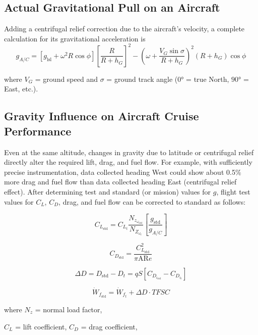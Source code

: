 \documentclass[
]{book}
\begin{document}
\hypertarget{actual-gravitational-pull-on-an-aircraft}{%
\subsection*{Actual Gravitational Pull on an Aircraft}\label{actual-gravitational-pull-on-an-aircraft}}

Adding a centrifugal relief correction due to the aircraft's velocity, a complete calculation for its gravitational acceleration is
\[
g_{A/C} = \left[ g_{\mathrm{lsl}} + \omega^2 R \cos{\phi} \right] \left[ \frac{R}{R + h_G} \right]^2 - \left( \omega + \frac{V_G \sin{\sigma}}{R + h_G} \right)^2 \left(R + h_G\right) \cos{\phi}
\]

where \(V_G\) = ground speed and \(\sigma\) = ground track angle (\(0°\) = true North, \(90°\) = East, etc.).

\hypertarget{gravity-influence-on-aircraft-cruise-performance}{%
\subsection*{Gravity Influence on Aircraft Cruise Performance}\label{gravity-influence-on-aircraft-cruise-performance}}

Even at the same altitude, changes in gravity due to latitude or centrifugal relief directly alter the required lift, drag, and fuel flow. For example, with sufficiently precise instrumentation, data collected heading West could show about 0.5\% more drag and fuel flow than data collected heading East (centrifugal relief effect). After determining test and standard (or mission) values for \(g\), flight test values for \(C_L\), \(C_D\), drag, and fuel flow can be corrected to standard as follows:

\[C_{L_{\mathrm{std}}} = C_{L_t} \frac{N_{z_{\omega_{\mathrm{std}}}}}{N_{Z_{\omega_t}}} \left[\frac{g_{\mathrm{std}}}{g_{A/C}} \right] \]

\[C_{D_{\mathrm{std}}} = \frac{C^2_{L_{\mathrm{std}}}}{\pi \mathrm{AR}e} \]

\[\Delta D = D_{\mathrm{std}} - D_t = qS\left[C_{D_{i_{\mathrm{std}}}} - C_{D_{i_t}} \right] \]

\[\dot{W}_{f_{\mathrm{std}}} = \dot{W}_{f_t} + \Delta D \cdot TFSC \]

where \(N_z\) = normal load factor,

\(C_L\) = lift coefficient, \(C_D\) = drag coefficient,
\end{document}
